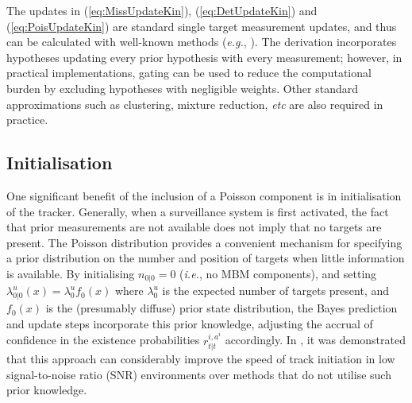 \documentclass[journal,twoside]{IEEEtran}
\theoremstyle{plain}
\begin{document}
The updates in (\ref{eq:MissUpdateKin}), (\ref{eq:DetUpdateKin}) and (\ref{eq:PoisUpdateKin}) are standard single target measurement updates, and thus can be calculated with well-known methods (\textit{e.g.}\xspace, \cite{RisAru04,JulUhl04}). The derivation incorporates hypotheses updating every prior hypothesis with every measurement; however, in practical implementations, gating can be used to reduce the computational burden by excluding hypotheses with negligible weights. Other standard approximations such as clustering, mixture reduction, \textit{etc}\xspace are also required in practice.

\subsection{Initialisation}
%
One significant benefit of the inclusion of a Poisson component is in initialisation of the tracker. Generally, when a surveillance system is first activated, the fact that prior measurements are not available does not imply that no targets are present. The Poisson distribution provides a convenient mechanism for specifying a prior distribution on the number and position of targets when little information is available. By initialising $n_{0|0}=0$ (\textit{i.e.}\xspace, no MBM components), and setting $\lambda^u_{0|0}(x)=\lambda^u_0 f_0(x)$ where $\lambda^u_0$ is the expected number of targets present, and $f_0(x)$ is the (presumably diffuse) prior state distribution, the Bayes prediction and update steps incorporate this prior knowledge, adjusting the accrual of confidence in the existence probabilities $r^{i,a^i}_{t|t}$ accordingly. In \cite{Wil12F2}, it was demonstrated that this approach can considerably improve the speed of track initiation in low signal-to-noise ratio (SNR) environments over methods that do not utilise such prior knowledge.
\end{document}
